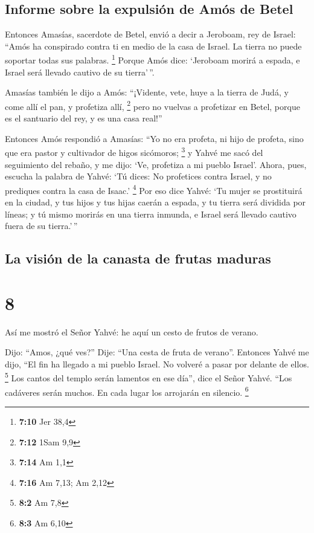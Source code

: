 \hypertarget{informe-sobre-la-expulsiuxf3n-de-amuxf3s-de-betel}{%
\subsection{Informe sobre la expulsión de Amós de
Betel}\label{informe-sobre-la-expulsiuxf3n-de-amuxf3s-de-betel}}

 Entonces Amasías, sacerdote de Betel, envió a decir a
Jeroboam, rey de Israel: ``Amós ha conspirado contra ti en medio de la
casa de Israel. La tierra no puede soportar todas sus palabras.
\footnote{\textbf{7:10} Jer 38,4}  Porque Amós dice:
`Jeroboam morirá a espada, e Israel será llevado cautivo de su
tierra'\,''.

 Amasías también le dijo a Amós: ``¡Vidente, vete, huye a
la tierra de Judá, y come allí el pan, y profetiza allí, \footnote{\textbf{7:12}
  1Sam 9,9}  pero no vuelvas a profetizar en Betel,
porque es el santuario del rey, y es una casa real!''

 Entonces Amós respondió a Amasías: ``Yo no era profeta,
ni hijo de profeta, sino que era pastor y cultivador de higos sicómoros;
\footnote{\textbf{7:14} Am 1,1}  y Yahvé me sacó del
seguimiento del rebaño, y me dijo: `Ve, profetiza a mi pueblo Israel'.
 Ahora, pues, escucha la palabra de Yahvé: `Tú dices: No
profetices contra Israel, y no prediques contra la casa de Isaac.'
\footnote{\textbf{7:16} Am 7,13; Am 2,12}  Por eso dice
Yahvé: `Tu mujer se prostituirá en la ciudad, y tus hijos y tus hijas
caerán a espada, y tu tierra será dividida por líneas; y tú mismo
morirás en una tierra inmunda, e Israel será llevado cautivo fuera de su
tierra.'\,''

\hypertarget{la-visiuxf3n-de-la-canasta-de-frutas-maduras}{%
\subsection{La visión de la canasta de frutas
maduras}\label{la-visiuxf3n-de-la-canasta-de-frutas-maduras}}

\hypertarget{section-7}{%
\section{8}\label{section-7}}

 Así me mostró el Señor Yahvé: he aquí un cesto de frutos
de verano.

 Dijo: ``Amos, ¿qué ves?'' Dije: ``Una cesta de fruta de
verano''. Entonces Yahvé me dijo, ``El fin ha llegado a mi pueblo
Israel. No volveré a pasar por delante de ellos. \footnote{\textbf{8:2}
  Am 7,8}  Los cantos del templo serán lamentos en ese
día'', dice el Señor Yahvé. ``Los cadáveres serán muchos. En cada lugar
los arrojarán en silencio. \footnote{\textbf{8:3} Am 6,10}

